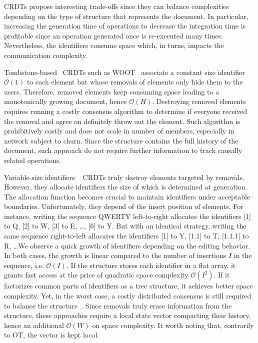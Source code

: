 \begin{asparadesc}
  CRDTs propose interesting trade-offs since they can balance complexities
  depending on the type of structure that represents the document.  In
  particular, increasing the generation time of operations to decrease the
  integration time is profitable since an operation generated once is
  re-executed many times. Nevertheless, the identifiers consume space which, in
  turns, impacts the communication complexity.

\item [Tombstone-based~\cite{ahmed2011evaluating, conway2014language,
    grishchenko2010deep, oster2006data, roh2011replicated, weiss2007wooki,
    wu2010partial, yu2012stringwise}] CRDTs such as WOOT~\cite{oster2006data}
  associate a constant size identifier $\mathcal{O}(1)$ to each element but
  whose removals of elements only hide them to the users. Therefore, removed
  elements keep consuming space leading to a monotonically growing document,
  hence $\mathcal{O}(H)$.  Destroying removed elements requires running a costly
  consensus algorithm to determine if everyone received the removal and agree on
  definitely throw out the element. Such algorithm is prohibitively costly and
  does not scale in number of members, especially in network subject to
  churn. Since the structure contains the full history of the document, such
  approach do not require further information to track causally related
  operations.

\item [Variable-size identifiers]~\cite{mehdi2014merging, nedelec2013lseq,
    preguica2009commutative, weiss2009logoot} CRDTs truly destroy elements
  targeted by removals. However, they allocate identifiers the size of which is
  determined at generation. The allocation function becomes crucial to maintain
  identifiers under acceptable boundaries. Unfortunately, they depend of the
  insert position of elements. For instance, writing the sequence QWERTY
  left-to-right allocates the identifiers [1] to Q, [2] to W, [3] to E, \ldots,
  [6] to Y. But with an identical strategy, writing the same sequence
  right-to-left allocates the identifiers [1] to Y, [1.1] to T, [1.1.1] to R,
  \ldots We observe a quick growth of identifiers depending on the editing
  behavior. In both cases, the growth is linear compared to the number of
  insertions $I$ in the sequence, i.e. $\mathcal{O}(I)$. If the structure stores
  each identifier in a flat array, it grants fast access at the price of
  quadratic space complexity $\mathcal{O}(I^2)$. If it factorizes common parts
  of identifiers as a tree structure, it achieves better space complexity. Yet,
  in the worst case, a costly distributed consensus is still required to balance
  the structure~\cite{zawirski2011asynchronous}. Since removals truly erase
  information from the structure, these approaches require a local state vector
  compacting their history, hence an additional $\mathcal{O}(W)$ on space
  complexity. It worth noting that, contrarily to OT, the vector is kept local.


\end{asparadesc}
